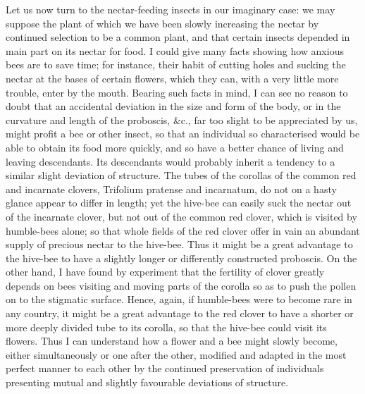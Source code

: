 \darwinpair
{Let us now turn to the nectar-feeding insects in our imaginary case: we may suppose the plant of which we have been slowly increasing the nectar by continued selection to be a common plant, and that certain insects depended in main part on its nectar for food. I could give many facts showing how anxious bees are to save time; for instance, their habit of cutting holes and sucking the nectar at the bases of certain flowers, which they can, with a very little more trouble, enter by the mouth. Bearing such facts in mind, I can see no reason to doubt that an accidental deviation in the size and form of the body, or in the curvature and length of the proboscis, \&c., far too slight to be appreciated by us, might profit a bee or other insect, so that an individual so characterised would be able to obtain its food more quickly, and so have a better chance of living and leaving descendants. Its descendants would probably inherit a tendency to a similar slight deviation of structure. The tubes of the corollas of the common red and incarnate clovers, Trifolium pratense and incarnatum, do not on a hasty glance appear to differ in length; yet the hive-bee can easily suck the nectar out of the incarnate clover, but not out of the common red clover, which is visited by humble-bees alone; so that whole fields of the red clover offer in vain an abundant supply of precious nectar to the hive-bee. Thus it might be a great advantage to the hive-bee to have a slightly longer or differently constructed proboscis. On the other hand, I have found by experiment that the fertility of clover greatly depends on bees visiting and moving parts of the corolla so as to push the pollen on to the stigmatic surface. Hence, again, if humble-bees were to become rare in any country, it might be a great advantage to the red clover to have a shorter or more deeply divided tube to its corolla, so that the hive-bee could visit its flowers. Thus I can understand how a flower and a bee might slowly become, either simultaneously or one after the other, modified and adapted in the most perfect manner to each other by the continued preservation of individuals presenting mutual and slightly favourable deviations of structure.}
